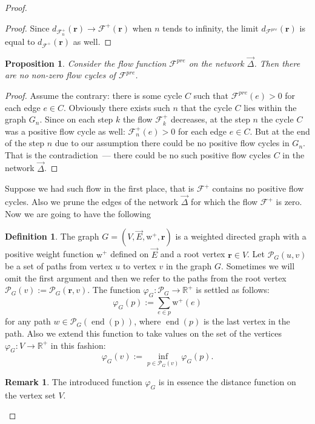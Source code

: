 \documentclass[12pt]{article}
\renewcommand{\cal}[1]{\mathcal{#1}}
\newcommand{\gfi}{\varphi_{G}}
\newtheorem{prop}{Proposition}
\theoremstyle{definition}
\newtheorem{remark}{Remark}
\newtheorem{definition}{Definition}
\newcommand{\wtp}{\mathrm{w}^{+}}
\newcommand{\flowpos}{\mathcal{F}^{+}}
\newcommand{\preflow}{\mathcal{F}^{pre}}
\newcommand{\flowposn}[1]{\mathcal{F}_{#1}^{+}}
\renewcommand{\root}{\mathbf{r}}
\newcommand{\onet}{\vec{\Delta}}
\newcommand{\gpaths}{\cal{P}_{G}}
\numberwithin{remark}{section}
\numberwithin{theorem}{section}
\numberwithin{prop}{section}
\numberwithin{equation}{section}
\numberwithin{lemma}{section}
\numberwithin{prop_under_lemma}{lemma}
\begin{document}
\begin{proof}
\begin{proof}
        Since $d_{\flowposn{n}}(\root) \to \flowpos(\root)$ when $n$ tends to infinity,
          the limit $d_{\preflow}(\root)$ is equal to $d_{\flowpos}(\root)$ as well.
      \end{proof}
      \begin{prop}
        Consider the flow function $\preflow$ on the network $\onet$.
        Then there are no non-zero flow cycles of $\preflow$.
      \end{prop}
      \begin{proof}
        Assume the contrary: there is some cycle $C$ such that $\preflow(e) > 0$ for
          each edge $e \in C$.
        Obviously there exists such $n$ that the cycle $C$ lies within the graph $G_n$.
        Since on each step $k$ the flow $\flowposn{k}$ decreases, at the step $n$
          the cycle $C$ was a positive flow cycle as well: $\flowposn{n}(e) > 0$ for each edge $e \in C$.
        But at the end of the step $n$ due to our assumption there could be no positive flow cycles in $G_n$.
        That is the contradiction~--- there could be no such positive flow cycles $C$ in the network $\onet$.
      \end{proof}
      Suppose we had such flow in the first place, that is $\flowpos$ contains no positive flow cycles.
      Also we prune the edges of the network $\onet$ for which the flow $\flowpos$ is zero.
      Now we are going to have the following
      \begin{definition}
        The graph $G = (V, \vec{E},\wtp, \root)$ is a weighted directed graph with a positive
          weight function $\wtp$ defined on $\vec{E}$ and a root vertex $\root \in V$.
        Let $\gpaths(u, v)$ be a set of paths from vertex $u$ to vertex $v$ in the graph $G$.
        Sometimes we will omit the first argument and then we refer to the paths from the root vertex
          $\gpaths(v) := \gpaths(\root, v)$.
        The function $\gfi: \gpaths \to \mathbb{R}^{+}$ is settled as follows:
        \[
          \gfi(p) := \sum_{e \in p} \wtp(e)
        \]
        for any path $w \in \gpaths(\operatorname{\operatorname{end}(p)})$, where $\operatorname{end}(p)$ is the last vertex in the path.
        Also we extend this function to take values on the set of the vertices $\gfi: V \to \mathbb{R}^{+}$ in this fashion:
        \[
          \gfi(v) := \inf_{p \in \gpaths(v)} \gfi(p).
        \]
      \end{definition}
      \begin{remark}
        The introduced function $\gfi$ is in essence the distance function on the vertex set $V$.

\end{remark}
\end{proof}
\end{document}
